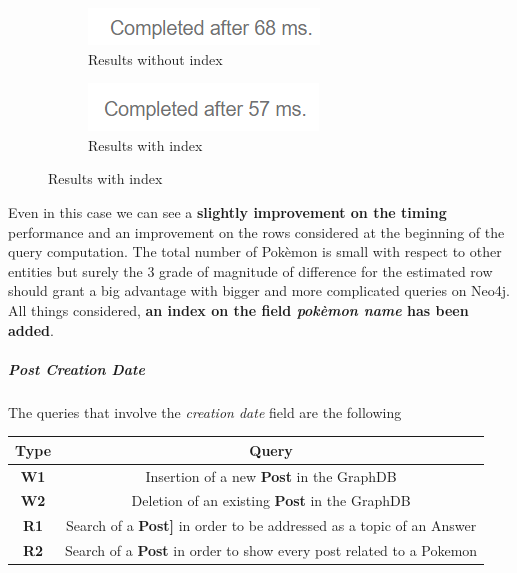 \begin{figure}[H]
\begin{subfigure}{0.5\textwidth}
	\end{subfigure}
\end{figure}
\begin{figure}[H]
	\begin{subfigure}{0.5\textwidth}
		\includegraphics[width=0.9\linewidth]{img/pokemon_without_index_2.png} 
		\caption{Results without index}
	\end{subfigure}
	\begin{subfigure}{0.5\textwidth}
		\includegraphics[width=0.9\linewidth]{img/pokemon_with_index_2.png}
		\caption{Results with index}
	\end{subfigure}
\end{figure}

Even in this case we can see a \textbf{slightly improvement on the timing} performance and an improvement on the rows considered at the beginning of the query computation. The total number of Pokèmon is small with respect to other entities but surely the 3 grade of magnitude of difference for the estimated row should grant a big advantage with bigger and more complicated queries on Neo4j. All things considered, \textbf{an index on the field \textit{pokèmon name} has been added}.
\subparagraph{Post Creation Date}
The queries that involve the \textit{creation date} field are the following

\begin{center}
	\begin{tabular}{| c | c |} 
		\hline
		\textbf{Type} & \textbf{Query} \\ [0.5ex] 
		\hline
		\textbf{W1} & Insertion of a new \textbf{Post} in the GraphDB\\ 
		\hline
		\textbf{W2} & Deletion of an existing \textbf{Post} in the GraphDB \\
		\hline
		\textbf{R1} & Search of a \textbf{Post]} in order to be addressed as a topic of an Answer\\
		\hline
		\textbf{R2} & Search of a \textbf{Post} in order to show every post related to a Pokemon\\
		\hline
	\end{tabular}
\end{center}

